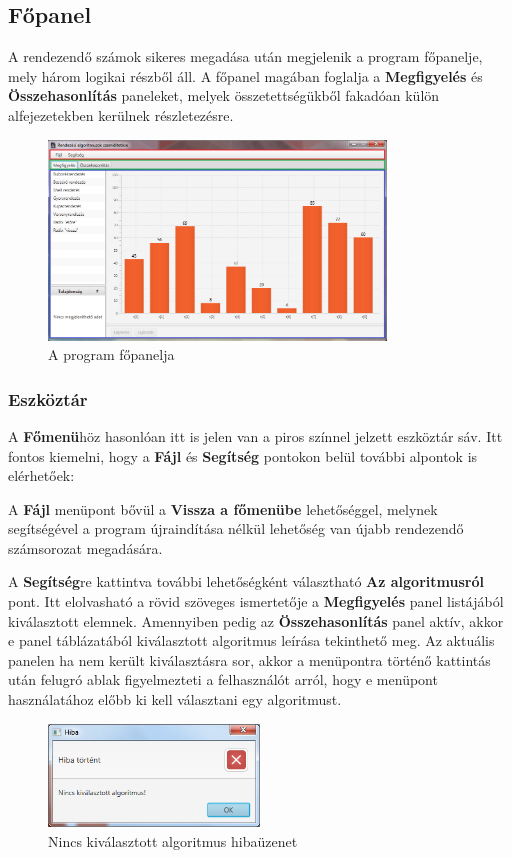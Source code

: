 \documentclass{elteikthesis}
\begin{document}
\subsection{Főpanel}
A rendezendő számok sikeres megadása után megjelenik a program főpanelje, mely három logikai részből áll. A főpanel magában foglalja a \textbf{Megfigyelés} és \textbf{Összehasonlítás} paneleket, melyek összetettségükből fakadóan külön alfejezetekben kerülnek részletezésre.
 \begin{figure}[H]
 	\centering
 	\includegraphics[width=0.8\textwidth]{pics/mainpanel.png}
 	\caption{A program főpanelja}
 \end{figure}
\subsubsection{Eszköztár}
A \textbf{Főmenü}höz hasonlóan itt is jelen van a piros színnel jelzett eszköztár sáv. Itt fontos kiemelni, hogy a \textbf{Fájl} és \textbf{Segítség} pontokon belül további alpontok is elérhetőek:\par
A \textbf{Fájl} menüpont bővül a \textbf{Vissza a főmenübe} lehetőséggel, melynek segítségével a program újraindítása nélkül lehetőség van újabb rendezendő számsorozat megadására.\par
A \textbf{Segítség}re kattintva további lehetőségként választható \textbf{Az algoritmusról} pont. Itt elolvasható a rövid szöveges ismertetője a \textbf{Megfigyelés} panel listájából kiválasztott elemnek. Amennyiben pedig az \textbf{Összehasonlítás} panel aktív, akkor e panel táblázatából kiválasztott algoritmus leírása tekinthető meg. Az aktuális panelen ha nem került kiválasztásra sor, akkor a menüpontra történő kattintás után felugró ablak figyelmezteti a felhasználót arról, hogy e menüpont használatához előbb ki kell választani egy algoritmust.
 \begin{figure}[H]
 	\centering
 	\includegraphics[width=0.5\textwidth]{pics/algorithm_error.png}
 	\caption{Nincs kiválasztott algoritmus hibaüzenet}
 \end{figure}
\end{document}

